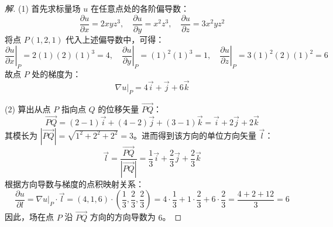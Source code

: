 \begin{proof}[解]
	(1) 首先求标量场 $u$ 在任意点处的各阶偏导数：
	$$ \frac{\partial u}{\partial x} = 2xyz^3, \quad \frac{\partial u}{\partial y} = x^2z^3, \quad \frac{\partial u}{\partial z} = 3x^2yz^2 $$
	将点 $P(1, 2, 1)$ 代入上述偏导数中，可得：
	$$ \left.\frac{\partial u}{\partial x}\right|_P = 2(1)(2)(1)^3 = 4, \quad \left.\frac{\partial u}{\partial y}\right|_P = (1)^2(1)^3 = 1, \quad \left.\frac{\partial u}{\partial z}\right|_P = 3(1)^2(2)(1)^2 = 6 $$
	故点 $P$ 处的梯度为：
	$$ \nabla u|_P = 4\vec{i} + \vec{j} + 6\vec{k} $$
	
	(2) 算出从点 $P$ 指向点 $Q$ 的位移矢量 $\vec{PQ}$：
	$$ \vec{PQ} = (2-1)\vec{i} + (4-2)\vec{j} + (3-1)\vec{k} = \vec{i} + 2\vec{j} + 2\vec{k} $$
	其模长为 $|\vec{PQ}| = \sqrt{1^2 + 2^2 + 2^2} = 3$。进而得到该方向的单位方向矢量 $\vec{l}$：
	$$ \vec{l} = \frac{\vec{PQ}}{|\vec{PQ}|} = \frac{1}{3}\vec{i} + \frac{2}{3}\vec{j} + \frac{2}{3}\vec{k} $$
	根据方向导数与梯度的点积映射关系：
	$$ \frac{\partial u}{\partial l} = \nabla u|_P \cdot \vec{l} = (4, 1, 6) \cdot \left(\frac{1}{3}, \frac{2}{3}, \frac{2}{3}\right) = 4\cdot\frac{1}{3} + 1\cdot\frac{2}{3} + 6\cdot\frac{2}{3} = \frac{4 + 2 + 12}{3} = 6 $$
	因此，场在点 $P$ 沿 $\vec{PQ}$ 方向的方向导数为 $6$。
\end{proof}